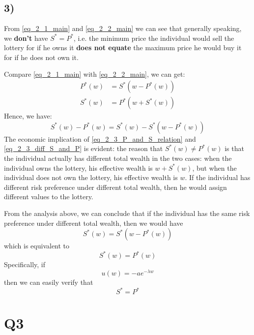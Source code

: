 \documentclass{article}
\begin{document}
\subsection*{3)}
From \eqref{eq_2_1_main} and \eqref{eq_2_2_main} we can see that generally speaking, we \textbf{don't} have $S^*=P^*$, i.e. the minimum price the individual would sell the lottery for if he owns it \textbf{does not equate} the maximum price he would buy it for if he does not own it.
	\par
	Compare \eqref{eq_2_1_main} with \eqref{eq_2_2_main}, we can get:
	\begin{equation}
		\label{eq_2_3_P_and_S_relation}
		\begin{aligned}
			P^{*} (w) & = S^{*}(w-P^{*}(w)) \\
			S^{*} (w) & = P^{*} (w + S^{*}(w)) 
		\end{aligned}
	\end{equation}
	Hence, we have:
	\begin{equation}
		\label{eq_2_3_diff_S_and_P}
		S^{*} (w) - P^{*}(w) = S^{*} (w) -  S^{*}(w-P^{*}(w))
	\end{equation}
	The economic implication of \eqref{eq_2_3_P_and_S_relation} and \eqref{eq_2_3_diff_S_and_P} is evident: the reason that $S^{*}(w) \neq P^{*}(w)$ is that the individual actually has different total wealth in the two cases: when the individual owns the lottery, his effective wealth is $w + S^{*}(w)$, but when the individual does not own the lottery, his effective wealth is $w$. If the individual has different risk preference under different total wealth, then he would assign different values to the lottery.
	\par
	From the analysis above, we can conclude that if the individual has the same risk preference under different total wealth, then we would have 
	\begin{equation}
		S^{*} (w) =  S^{*}(w-P^{*}(w))
	\end{equation}
	which is equivalent to
	\begin{equation}
		S^{*} (w) = P^{*}(w)
	\end{equation}
	Specifically, if 
	\begin{equation}
		u(w) = - a e^{-\lambda w}
	\end{equation}
	then we can easily verify that 
	\begin{equation}
		S^{*} = P^{*}
	\end{equation}

\section*{Q3}
\end{document}
